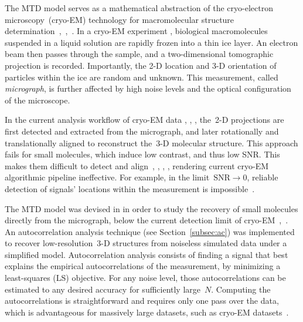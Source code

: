 \documentclass{article}
\begin{document}
The MTD model serves as a mathematical abstraction of the cryo-electron microscopy~(\mbox{cryo-EM}) technology for macromolecular structure determination~\cite{henderson1995potential},~\cite{nogales2016development},~\cite{bai2015cryo}. In a \mbox{cryo-EM} experiment \cite{frank2006three}, biological macromolecules suspended in a liquid solution are rapidly frozen into a thin ice layer. An electron beam then passes through the sample, and a two-dimensional tomographic projection is recorded. Importantly, the \mbox{2-D} location and \mbox{3-D} orientation of particles within the ice are random and unknown. This measurement, called \textit{micrograph}, is further affected by high noise levels and the optical configuration of the microscope.

In the current analysis workflow of \mbox{cryo-EM} data \cite{bendory2020single}, \cite{scheres2012relion}, \cite{punjani2017cryosparc}, the~\mbox{2-D} projections are first detected and extracted from the micrograph, and later rotationally and translationally aligned to reconstruct the~\mbox{3-D} molecular structure. This approach fails for small molecules, which induce low contrast, and thus low SNR. This makes them difficult to detect and align~\cite{bendory2018toward}, \cite{henderson1995potential}, \cite{bendory2020single}, \cite{aguerrebere2016fundamental}, rendering current \mbox{cryo-EM} algorithmic pipeline ineffective. For example, in the limit~\mbox{$\text{SNR} \rightarrow 0$}, reliable detection of signals' locations within the measurement is impossible~\cite[Proposition~3.1]{bendory2018toward}.

The MTD model was devised in \cite{bendory2018toward} in order to study the recovery of small molecules directly from the micrograph, below the current detection limit of \mbox{cryo-EM}~\cite{henderson1995potential},~\cite{d2021current}. An autocorrelation analysis technique (see Section~\ref{subsec:ac}) was implemented to recover \mbox{low-resolution}~\mbox{3-D} structures from noiseless simulated data under a simplified model. Autocorrelation analysis consists of finding a signal that best explains the empirical autocorrelations of the measurement,  by minimizing a {least-squares} (LS) objective. For any noise level, those autocorrelations can be estimated to any desired accuracy for sufficiently large~$N$. Computing the autocorrelations is straightforward and requires only one pass over the data, which is advantageous for massively large datasets, such as \mbox{cryo-EM} datasets~\cite{bendory2020single}.
\end{document}
